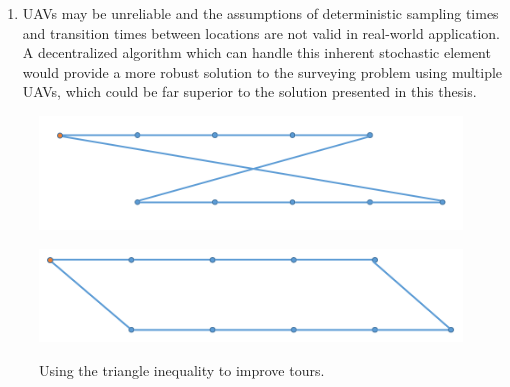 \begin{enumerate}
    \item UAVs may be unreliable and the assumptions of deterministic sampling times and transition times between locations are not valid in real-world application. A decentralized algorithm which can handle this inherent stochastic element would provide a more robust solution to the surveying problem using multiple UAVs, which could be far superior to the solution presented in this thesis.
    
    
\end{enumerate}


\begin{figure}
\centering
\begin{minipage}{.5\textwidth}
  \centering
  \includegraphics[width=.48\linewidth]{Chapters/MultiAgentCoverage/Figs/crossingSegments.PNG}
  \label{fig:crossingTour}
\end{minipage}%
\begin{minipage}{.5\textwidth}
  \centering
  \includegraphics[width=.48\linewidth]{Chapters/MultiAgentCoverage/Figs/nonCrossingSegments.png}
  \label{fig:nonCrossingTour}
\end{minipage}
\caption{Using the triangle inequality to improve tours.}
\label{fig:fixingTourCrossing}
\end{figure}























